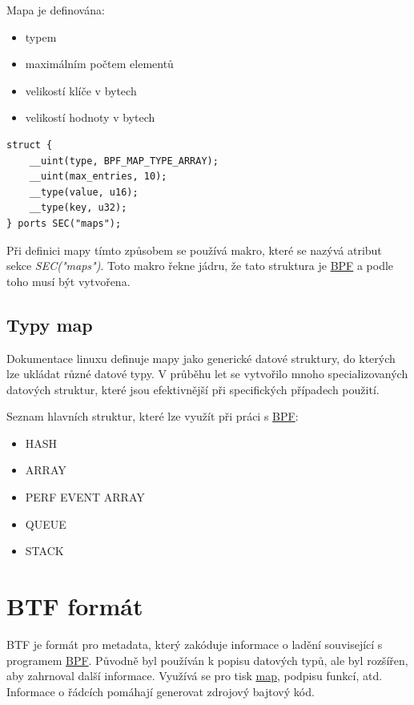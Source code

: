 \bigskip
Mapa\cite{BpfMaps} je definována:
\begin{itemize}[noitemsep]
    \item{typem}
    \item{maximálním počtem elementů}
    \item{velikostí klíče v bytech}
    \item{velikostí hodnoty v bytech}
\end{itemize}

\begin{lstlisting}[style=c++,caption={Ukázka mapy v jazyce C},captionpos=b]
struct {
    __uint(type, BPF_MAP_TYPE_ARRAY);
    __uint(max_entries, 10);
    __type(value, u16);
    __type(key, u32);
} ports SEC("maps");
\end{lstlisting}

Při definici mapy tímto způsobem se používá makro, které se nazývá atribut sekce \emph{SEC("maps")}. Toto makro řekne jádru, že tato struktura je \hyperref[sec:BPF]{BPF} a podle toho musí být vytvořena.

\subsection{Typy map}

Dokumentace linuxu definuje mapy jako generické datové struktury, do kterých lze ukládat různé datové typy. V průběhu let se vytvořilo mnoho specializovaných datových struktur, které jsou efektivnější při specifických případech použití.

\bigskip
Seznam hlavních struktur, které lze využít při práci s \hyperref[sec:BPF]{BPF}:
\begin{itemize}[noitemsep]
    \item{HASH}
    \item{ARRAY}
    \item{PERF EVENT ARRAY}
    \item{QUEUE}
    \item{STACK}
\end{itemize}

\section{BTF formát}

BTF\cite{BTF} je formát pro metadata, který zakóduje informace o ladění související s programem \hyperref[sec:BPF]{BPF}. Původně byl používán k popisu datových typů, ale byl rozšířen, aby zahrnoval další informace. Využívá se pro tisk \hyperref[sec:BpfMapy]{map}, podpisu funkcí, atd. Informace o řádcích pomáhají generovat zdrojový bajtový kód.

